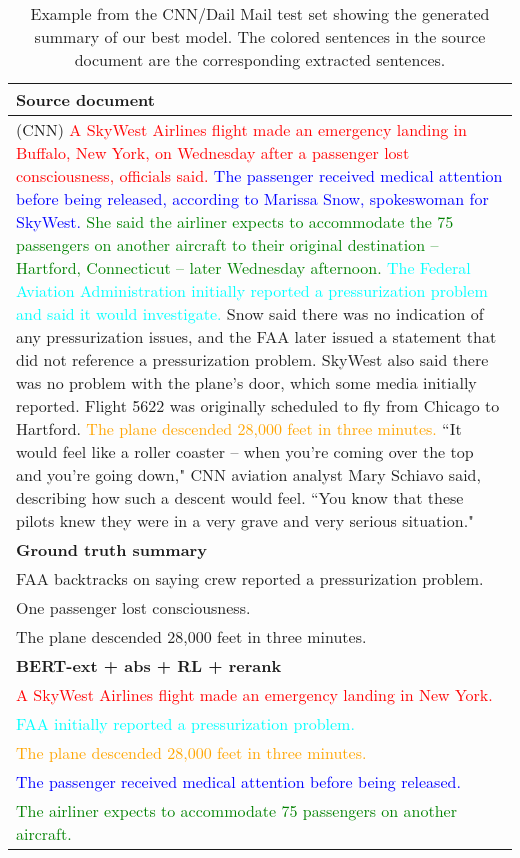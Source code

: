 \documentclass[11pt,a4paper]{article}
\begin{document}
\begin{table*}
\centering
\begin{adjustbox}{width=\textwidth}
\begin{tabular}{|p{15cm}|}
    \hline 
    \bf Source document \\
    \hline
(CNN) \textcolor{red}{A SkyWest Airlines flight made an emergency landing in Buffalo, New York, on Wednesday after a passenger lost consciousness, officials said.}
\textcolor{blue}{The passenger received medical attention before being released, according to Marissa Snow, spokeswoman for SkyWest.} \textcolor{green}{She said the airliner expects to accommodate the 75 passengers on another aircraft to their original destination -- Hartford, Connecticut -- later Wednesday afternoon.}
\textcolor{cyan}{The Federal Aviation Administration initially reported a pressurization problem and said it would investigate.} Snow said there was no indication of any pressurization issues, and the FAA later issued a statement that did not reference a pressurization problem.
SkyWest also said there was no problem with the plane's door, which some media initially reported.
Flight 5622 was originally scheduled to fly from Chicago to Hartford. \textcolor{orange}{The plane descended 28,000 feet in three minutes.}
``It would feel like a roller coaster -- when you're coming over the top and you're going down," CNN aviation analyst Mary Schiavo said, describing how such a descent would feel. ``You know that these pilots knew they were in a very grave and very serious situation." \\
   \hline
   \bf Ground truth summary \\
   \hline
   FAA backtracks on saying crew reported a pressurization problem.\\
   One passenger lost consciousness.\\
   The plane descended 28,000 feet in three minutes.\\
   \hline
   \bf BERT-ext + abs + RL + rerank \\
   \hline
   \textcolor{red}{A SkyWest Airlines flight made an emergency landing in New York.}\\
   \textcolor{cyan}{FAA initially reported a pressurization problem.}\\
   \textcolor{orange}{The plane descended 28,000 feet in three minutes.}\\
   \textcolor{blue}{The passenger received medical attention before being released.}\\
   \textcolor{green}{The airliner expects to accommodate 75 passengers on another aircraft.}\\
   \hline
\end{tabular}
\end{adjustbox}
\caption{\label{table:example2} Example from the CNN/Dail Mail test set showing the generated summary of our best model. The colored sentences in the source document are the corresponding extracted sentences.}
\end{table*}
\end{document}

